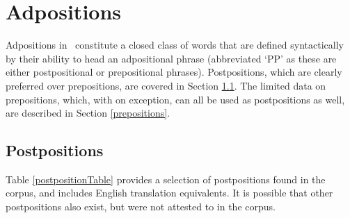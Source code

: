 \section{Adpositions}\label{adpositions}
Adpositions in \PS\ constitute a closed class of words that are defined syntactically by their ability to head an adpositional phrase (abbreviated ‘PP’ as these are either postpositional or prepositional phrases). 
Postpositions, which are clearly preferred over prepositions, are covered in Section \ref{postpositions}. The limited data on prepositions, which, with on exception, can all be used as postpositions as well, are described in Section \ref{prepositions}. 

\subsection{Postpositions}\label{postpositions}
Table \vref{postpositionTable} provides a selection of postpositions found in the corpus, and includes English translation equivalents. %
It is possible that other postpositions also exist, but were not attested to in the corpus. %
